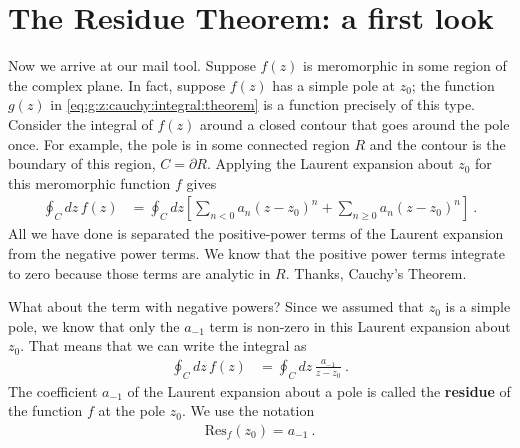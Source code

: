 \documentclass[
  11pt,
	colorful,
	raggedright,
]{tufte-style-thesis-flip}
\begin{document}
\section{The Residue Theorem: a first look}

Now we arrive at our mail tool. Suppose $f(z)$ is meromorphic in some region of the complex plane. In fact, suppose $f(z)$ has a simple pole at $z_0$; the function $g(z)$ in \eqref{eq:g:z:cauchy:integral:theorem} is a function precisely of this type. Consider the integral of $f(z)$ around a closed contour that goes around the pole once. For example, the pole is in some connected region $R$ and the contour is the boundary of this region, $C=\partial R$. Applying the Laurent expansion about $z_0$ for this meromorphic function $f$ gives
\begin{align}
  \oint_C dz\, f(z) &= \oint_C dz 
  \left[
  \sum_{n<0} a_n (z-z_0)^n + \sum_{n\geq 0} a_n (z-z_0)^n
  \right] \ .
\end{align}
All we have done is separated the positive-power terms of the Laurent expansion from the negative power terms. We know that the positive power terms integrate to zero because those terms are analytic in $R$. Thanks, Cauchy's Theorem.

What about the term with negative powers? Since we assumed that $z_0$ is a simple pole, we know that only the $a_{-1}$ term is non-zero in this Laurent expansion about $z_0$. That means that we can write the integral as
\begin{align}
  \oint_C dz\, f(z) &= 
  \oint_C dz \,
  \frac{a_{-1}}{z-z_0} 
  \ .
  \label{eq:residue:int:step:1}
\end{align}
The coefficient $a_{-1}$ of the Laurent expansion about a pole is called the \textbf{residue} of the function $f$ at the pole $z_0$. We use the notation 
\begin{align}
\text{Res}_f(z_0) = a_{-1} \ .
\end{align}
 
\end{document}
